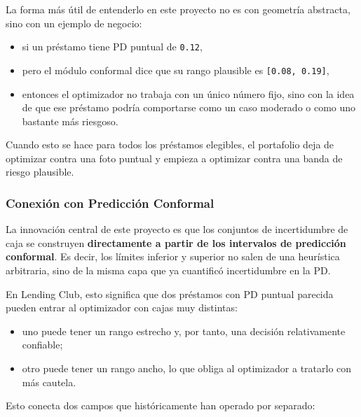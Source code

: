\documentclass[
  spanish,
  11pt,
  letterpaper,
]{scrbook}
\providecommand{\tightlist}{%
  \setlength{\itemsep}{0pt}\setlength{\parskip}{0pt}}
\theoremstyle{plain}
\theoremstyle{remark}
\begin{document}
La forma más útil de entenderlo en este proyecto no es con geometría
abstracta, sino con un ejemplo de negocio:

\begin{itemize}
\tightlist
\item
  si un préstamo tiene PD puntual de \texttt{0.12},
\item
  pero el módulo conformal dice que su rango plausible es
  \texttt{{[}0.08,\ 0.19{]}},
\item
  entonces el optimizador no trabaja con un único número fijo, sino con
  la idea de que ese préstamo podría comportarse como un caso moderado o
  como uno bastante más riesgoso.
\end{itemize}

Cuando esto se hace para todos los préstamos elegibles, el portafolio
deja de optimizar contra una foto puntual y empieza a optimizar contra
una banda de riesgo plausible.

\subsubsection{Conexión con Predicción
Conformal}\label{conexiuxf3n-con-predicciuxf3n-conformal}

La innovación central de este proyecto es que los conjuntos de
incertidumbre de caja se construyen \textbf{directamente a partir de los
intervalos de predicción conformal}. Es decir, los límites inferior y
superior no salen de una heurística arbitraria, sino de la misma capa
que ya cuantificó incertidumbre en la PD.

En Lending Club, esto significa que dos préstamos con PD puntual
parecida pueden entrar al optimizador con cajas muy distintas:

\begin{itemize}
\tightlist
\item
  uno puede tener un rango estrecho y, por tanto, una decisión
  relativamente confiable;
\item
  otro puede tener un rango ancho, lo que obliga al optimizador a
  tratarlo con más cautela.
\end{itemize}

Esto conecta dos campos que históricamente han operado por separado:
\end{document}

